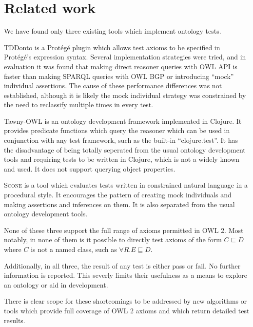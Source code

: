 \documentclass[paper.tex]{subfiles}
\begin{document}
\section{Related work}
\label{sec:related}

We have found only three existing tools which implement ontology tests.

TDDonto \cite{Lawrynowicz:TDDontoTool} is a Prot\'eg\'e plugin which allows test axioms to be specified in Prot\'eg\'e's expression syntax.
Several implementation strategies were tried, and in evaluation it was found that making direct reasoner queries with OWL API is faster than making SPARQL queries with OWL BGP or introducing ``mock'' individual assertions.
The cause of these performance differences was not established, although it is likely the mock individual strategy was constrained by the need to reclassify multiple times in every test.

Tawny-OWL \cite{Warrender:HowWhatWhyTest} is an ontology development framework implemented in Clojure.
It provides predicate functions which query the reasoner which can be used in conjunction with any test framework, such as the built-in ``clojure.test''.
It has the disadvantage of being totally seperated from the usual ontology development tools and requiring tests to be written in Clojure, which is not a widely known and used.
It does not support querying object properties.

\textsc{Scone} \cite{Scone:Bitbucket} is a tool which evaluates tests written in constrained natural language in a procedural style.
It encourages the pattern of creating mock individuals and making assertions and inferences on them.
It is also separated from the usual ontology development tools.

None of these three support the full range of axioms permitted in OWL 2.
Most notably, in none of them is it possible to directly test axioms of the form $C \sqsubseteq D$ where $C$ is not a named class, such as $\forall R.E \sqsubseteq D$.

Additionally, in all three, the result of any test is either pass or fail.
No further information is reported.
This severly limits their usefulness as a means to explore an ontology or aid in development.

There is clear scope for these shortcomings to be addressed by new algorithms or tools which provide full coverage of OWL 2 axioms and which return detailed test results.
\end{document}
